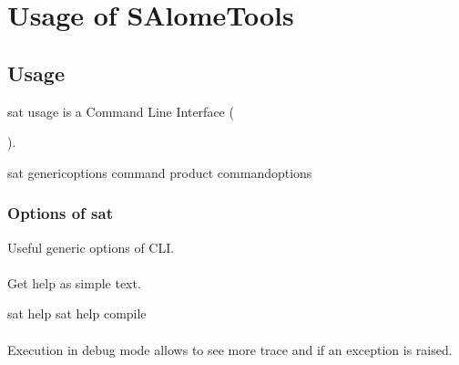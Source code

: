 \documentclass[a4paper,10pt,english]{sphinxmanual}
\begin{document}
\clearpage


\section{Usage of SAlomeTools}
\label{\detokenize{usage_of_sat:svn}}\label{\detokenize{usage_of_sat:usage-of-salometools}}\label{\detokenize{usage_of_sat::doc}}

\subsection{Usage}
\label{\detokenize{usage_of_sat:usage}}
sat usage is a Command Line Interface (%
\begin{footnote}[4]\sphinxAtStartFootnote
{}
%
\end{footnote}).

%
\begin{sphinxVerbatim}[commandchars=\\\{\}]
sat \PYG{o}{[}generic\PYGZus{}options\PYG{o}{]} \PYG{o}{[}command\PYG{o}{]} \PYG{o}{[}product\PYG{o}{]} \PYG{o}{[}command\PYGZus{}options\PYG{o}{]}
\end{sphinxVerbatim}


\subsubsection{Options of sat}
\label{\detokenize{usage_of_sat:options-of-sat}}
Useful  generic options of  CLI.


\paragraph{}
\label{\detokenize{usage_of_sat:help-or-h}}
Get help as simple text.

%
\begin{sphinxVerbatim}[commandchars=\\\{\}]
sat \PYGZhy{}\PYGZhy{}help          
sat \PYGZhy{}\PYGZhy{}help compile  
\end{sphinxVerbatim}


\paragraph{}
\label{\detokenize{usage_of_sat:debug-or-g}}
Execution in debug mode allows to see more trace and  if an exception is raised.
\end{document}
